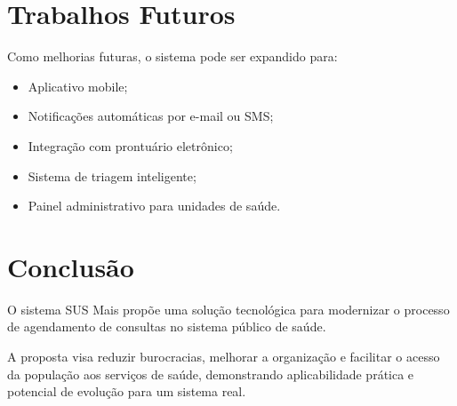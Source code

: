 \documentclass[12pt,a4paper]{article}
\begin{document}
\section{Trabalhos Futuros}

Como melhorias futuras, o sistema pode ser expandido para:

\begin{itemize}
    \item Aplicativo mobile;
    \item Notificações automáticas por e-mail ou SMS;
    \item Integração com prontuário eletrônico;
    \item Sistema de triagem inteligente;
    \item Painel administrativo para unidades de saúde.
\end{itemize}

\section{Conclusão}

O sistema SUS Mais propõe uma solução tecnológica para modernizar o processo de agendamento de consultas no sistema público de saúde.

A proposta visa reduzir burocracias, melhorar a organização e facilitar o acesso da população aos serviços de saúde, demonstrando aplicabilidade prática e potencial de evolução para um sistema real.
\end{document}
